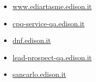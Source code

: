 \documentclass{article}
\begin{document}
\begin{itemize}
        
        
        \item \href{ http://www.ediartasme.edison.it/ }{ www.ediartasme.edison.it }
    
        
        
        \item \href{ https://cpq-service-qa.edison.it/ }{ cpq-service-qa.edison.it }
    
        
        
        \item \href{ https://dnf.edison.it/ }{ dnf.edison.it }
    
        
        
        \item \href{ https://lead-prospect-qa.edison.it/ }{ lead-prospect-qa.edison.it }
    
        
        
        \item \href{ https://sancarlo.edison.it/Default.aspx }{ sancarlo.edison.it }
    
        
        

\end{itemize}
\end{document}
